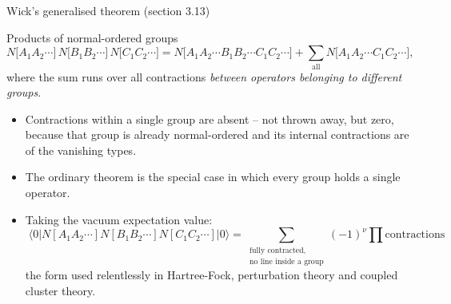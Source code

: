 \documentclass[aspectratio=169,10pt]{beamer}
\newcommand{\ket}[1]{\vert #1\rangle}
\newcommand{\bra}[1]{\langle #1\vert}
\begin{document}
\begin{frame}{Wick's generalised theorem (section 3.13)}
  \small
  \begin{block}{Products of normal-ordered groups}
    \[
      N\bigl[A_1A_2\cdots\bigr]\,N\bigl[B_1B_2\cdots\bigr]\,N\bigl[C_1C_2\cdots\bigr]
      =N\bigl[A_1A_2\cdots B_1B_2\cdots C_1C_2\cdots\bigr]
      +\sum_{\mathrm{all}}N\bigl[A_1A_2\cdots C_1C_2\cdots\bigr],
    \]
    where the sum runs over all contractions \emph{between operators belonging to different groups}.
  \end{block}
  \begin{itemize}
    \item Contractions within a single group are absent -- not thrown away, but \alert{zero}, because that group is already normal-ordered and its internal contractions are of the vanishing types.
    \item The ordinary theorem is the special case in which every group holds a single operator.
    \item Taking the vacuum expectation value:
    \[
      \boxed{\;\bra{0}N[A_1A_2\cdots]N[B_1B_2\cdots]N[C_1C_2\cdots]\ket{0}
      =\sum_{\substack{\text{fully contracted,}\\\text{no line inside a group}}}(-1)^{\nu}\prod\text{contractions}\;}
    \]
    the form used relentlessly in Hartree-Fock, perturbation theory and coupled cluster theory.
  \end{itemize}
\end{frame}
\end{document}
